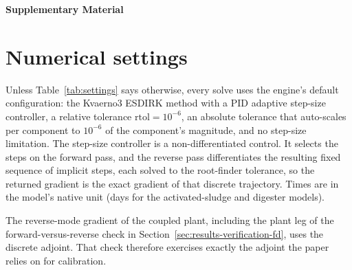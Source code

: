 \documentclass{article}
\begin{document}
\setcounter{section}{0}
\setcounter{equation}{0}
\setcounter{figure}{0}
\setcounter{table}{0}
\renewcommand{\thesection}{S.\arabic{section}}
\renewcommand{\theequation}{S.\arabic{equation}}
\renewcommand{\thefigure}{S.\arabic{figure}}
\renewcommand{\thetable}{S.\arabic{table}}
\renewcommand{\theHsection}{S.\arabic{section}}
\renewcommand{\theHequation}{S.\arabic{equation}}
\renewcommand{\theHfigure}{S.\arabic{figure}}
\renewcommand{\theHtable}{S.\arabic{table}}
\setlength{\LTcapwidth}{\textwidth}

\begin{center}\large\bfseries Supplementary Material\end{center}

\section{Numerical settings}
\label{si:settings}
Unless Table~\ref{tab:settings} says otherwise, every solve uses the engine's default configuration: the Kvaerno3 ESDIRK method with a PID adaptive step-size controller, a relative tolerance \(\mathrm{rtol}=10^{-6}\), an absolute tolerance that auto-scales per component to \(10^{-6}\) of the component's magnitude, and no step-size limitation. The step-size controller is a non-differentiated control. It selects the steps on the forward pass, and the reverse pass differentiates the resulting fixed sequence of implicit steps, each solved to the root-finder tolerance, so the returned gradient is the exact gradient of that discrete trajectory. Times are in the model's native unit (days for the activated-sludge and digester models).

The reverse-mode gradient of the coupled plant, including the plant leg of the forward-versus-reverse check in Section~\ref{sec:results-verification-fd}, uses the discrete adjoint. That check therefore exercises exactly the adjoint the paper relies on for calibration.
\end{document}
